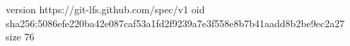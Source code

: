 version https://git-lfs.github.com/spec/v1
oid sha256:5086efe220ba42e087caf53a1fd2f9239a7e3f558e8b7b41aadd8b2be9ec2a27
size 76
